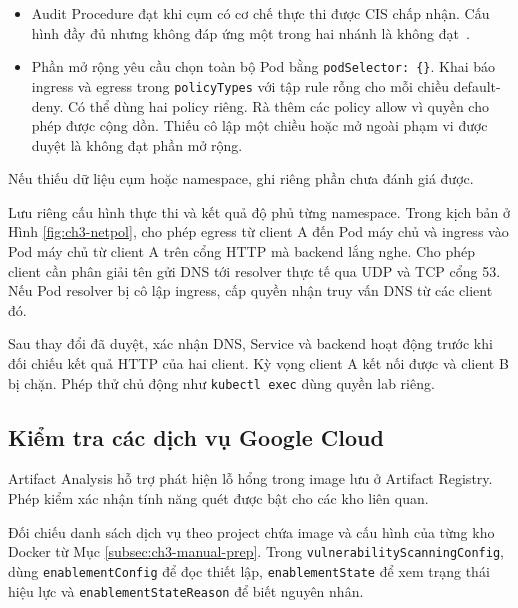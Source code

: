\begin{itemize}[leftmargin=1.1cm,itemsep=0pt,topsep=3pt]
  \item Audit Procedure đạt khi cụm có cơ chế thực thi được CIS chấp nhận. Cấu hình đầy đủ nhưng không đáp ứng một trong hai nhánh là không đạt~\mbox{}.
  \item Phần mở rộng yêu cầu chọn toàn bộ Pod bằng \texttt{podSelector: \{\}}. Khai báo ingress và egress trong \texttt{policyTypes} với tập rule rỗng cho mỗi chiều default-deny. Có thể dùng hai policy riêng. Rà thêm các policy allow vì quyền cho phép được cộng dồn. Thiếu cô lập một chiều hoặc mở ngoài phạm vi được duyệt là không đạt phần mở rộng.
\end{itemize}
Nếu thiếu dữ liệu cụm hoặc namespace, ghi riêng phần chưa đánh giá được.

Lưu riêng cấu hình thực thi và kết quả độ phủ từng namespace. Trong kịch bản ở Hình \ref{fig:ch3-netpol}, cho phép egress từ client A đến Pod máy chủ và ingress vào Pod máy chủ từ client A trên cổng HTTP mà backend lắng nghe. Cho phép client cần phân giải tên gửi DNS tới resolver thực tế qua UDP và TCP cổng 53. Nếu Pod resolver bị cô lập ingress, cấp quyền nhận truy vấn DNS từ các client đó.

Sau thay đổi đã duyệt, xác nhận DNS, Service và backend hoạt động trước khi đối chiếu kết quả HTTP của hai client. Kỳ vọng client A kết nối được và client B bị chặn. Phép thử chủ động như \texttt{kubectl exec} dùng quyền lab riêng.


\subsection{Kiểm tra các dịch vụ Google Cloud}

Artifact Analysis hỗ trợ phát hiện lỗ hổng trong image lưu ở Artifact Registry. Phép kiểm xác nhận tính năng quét được bật cho các kho liên quan.

Đối chiếu danh sách dịch vụ theo project chứa image và cấu hình của từng kho Docker từ Mục \ref{subsec:ch3-manual-prep}. Trong \texttt{vulnerabilityScanningConfig}, dùng \texttt{enablementConfig} để đọc thiết lập, \texttt{enablementState} để xem trạng thái hiệu lực và \texttt{enablementStateReason} để biết nguyên nhân.

